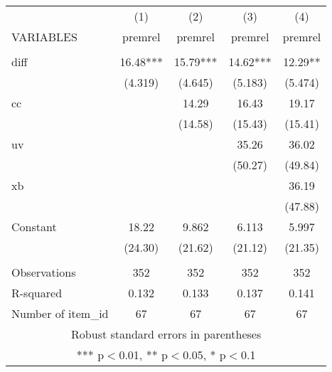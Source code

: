\begin{tabular}{lcccc} \hline
 & (1) & (2) & (3) & (4) \\
VARIABLES & premrel & premrel & premrel & premrel \\ \hline
 &  &  &  &  \\
diff & 16.48*** & 15.79*** & 14.62*** & 12.29** \\
 & (4.319) & (4.645) & (5.183) & (5.474) \\
cc &  & 14.29 & 16.43 & 19.17 \\
 &  & (14.58) & (15.43) & (15.41) \\
uv &  &  & 35.26 & 36.02 \\
 &  &  & (50.27) & (49.84) \\
xb &  &  &  & 36.19 \\
 &  &  &  & (47.88) \\
Constant & 18.22 & 9.862 & 6.113 & 5.997 \\
 & (24.30) & (21.62) & (21.12) & (21.35) \\
 &  &  &  &  \\
Observations & 352 & 352 & 352 & 352 \\
R-squared & 0.132 & 0.133 & 0.137 & 0.141 \\
 Number of item\_id & 67 & 67 & 67 & 67 \\ \hline
\multicolumn{5}{c}{ Robust standard errors in parentheses} \\
\multicolumn{5}{c}{ *** p$<$0.01, ** p$<$0.05, * p$<$0.1} \\
\end{tabular}

